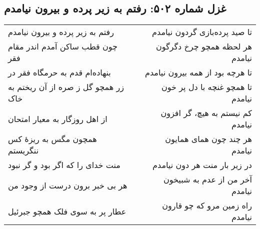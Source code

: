 \begin{center}
\section*{غزل شماره ۵۰۲: رفتم به زیر پرده و بیرون نیامدم}
\label{sec:502}
\begin{longtable}{l p{0.5cm} r}
رفتم به زیر پرده و بیرون نیامدم
&&
تا صید پرده‌بازی گردون نیامدم
\\
چون قطب ساکن آمدم اندر مقام فقر
&&
هر لحظه همچو چرخ دگرگون نیامدم
\\
بنهاده‌ام قدم به حرمگاه فقر در
&&
تا هرچه بود از همه بیرون نیامدم
\\
زر همچو گل ز صره از آن ریختم به خاک
&&
تا همچو غنچه با دل پر خون نیامدم
\\
از اهل روزگار به معیار امتحان
&&
کم نیستم به هیچ، گر افزون نیامدم
\\
همچون مگس به ریزهٔ کس ننگریستم
&&
هر چند چون همای همایون نیامدم
\\
منت خدای را که اگر بود و گر نبود
&&
در زیر بار منت هر دون نیامدم
\\
هر بی خبر برون درست از وجود من
&&
آخر من از عدم به شبیخون نیامدم
\\
عطار پر به سوی فلک همچو جبرئیل
&&
راه زمین مرو که چو قارون نیامدم
\\
\end{longtable}
\end{center}
